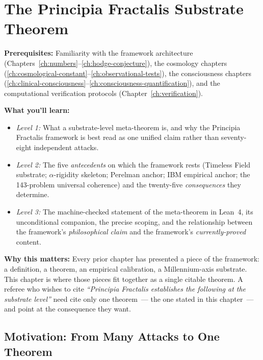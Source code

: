\chapter{The Principia Fractalis Substrate Theorem}
\label{ch:substrate-theorem}

\begin{chapterobjectives}
\textbf{Prerequisites:} Familiarity with the framework architecture
(Chapters~\ref{ch:numbers}--\ref{ch:hodge-conjecture}), the cosmology chapters
(\ref{ch:cosmological-constant}--\ref{ch:observational-tests}),
the consciousness chapters (\ref{ch:clinical-consciousness}--\ref{ch:consciousness-quantification}),
and the computational verification protocols (Chapter~\ref{ch:verification}).

\textbf{What you'll learn:}
\begin{itemize}
\item \emph{Level 1:} What a substrate-level meta-theorem is, and why
the Principia Fractalis framework is best read as one unified claim
rather than seventy-eight independent attacks.
\item \emph{Level 2:} The five \emph{antecedents} on which the
framework rests (Timeless Field substrate; $\alpha$-rigidity
skeleton; Perelman anchor; IBM empirical anchor; the 143-problem
universal coherence) and the twenty-five \emph{consequences} they
determine.
\item \emph{Level 3:} The machine-checked statement of the
meta-theorem in Lean~4, its unconditional companion, the precise
scoping, and the relationship between the framework's
\emph{philosophical claim} and the framework's
\emph{currently-proved} content.
\end{itemize}

\textbf{Why this matters:} Every prior chapter has presented a
piece of the framework: a definition, a theorem, an empirical
calibration, a Millennium-axis substrate. This chapter is where
those pieces fit together as a single citable theorem. A referee
who wishes to cite \emph{``Principia Fractalis establishes the
following at the substrate level''} need cite only one
theorem~--- the one stated in this chapter~--- and point at the
consequence they want.
\end{chapterobjectives}

\section{Motivation: From Many Attacks to One Theorem}
\label{sec:substrate-theorem-motivation}

